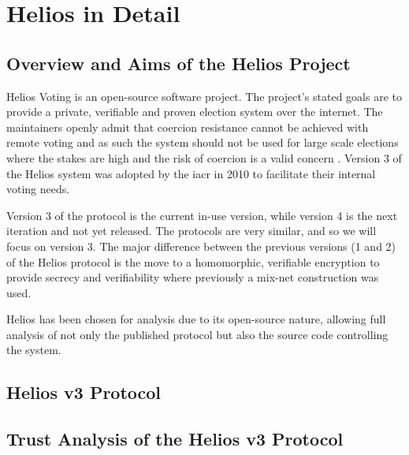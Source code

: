 
\chapter{Helios in Detail}
\label{ch:helios}

\section{Overview and Aims of the Helios Project}
\label{ch:helios:aims}

Helios Voting is an open-source software project. The project's stated goals are to provide a private, verifiable and proven election system over the internet. The maintainers openly admit that coercion resistance cannot be achieved with remote voting and as such the system should not be used for large scale elections where the stakes are high and the risk of coercion is a valid concern \cite{HeliosVotingFAQ}. Version 3 of the Helios system was adopted by the \gls{iacr} \cite{HeliosCryptographers2010} in 2010 to facilitate their internal voting needs.

Version 3 of the protocol is the current in-use version, while version 4 is the next iteration and not yet released. The protocols are very similar, and so we will focus on version 3. The major difference between the previous versions (1 and 2) of the Helios protocol is the move to a homomorphic, verifiable encryption to provide secrecy and verifiability where previously a mix-net construction was used.

Helios has been chosen for analysis due to its open-source nature, allowing full analysis of not only the published protocol but also the source code controlling the system.


\section{Helios v3 Protocol}
\label{ch:helios:v3}




\section{Trust Analysis of the Helios v3 Protocol}
\label{ch:helios:trust}

